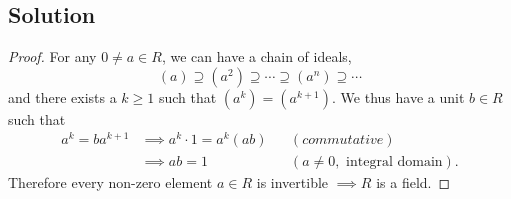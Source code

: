 \documentclass{article}
\theoremstyle{plain}
\begin{document}
\subsection*{Solution}
\begin{proof}
For any $0\ne a\in R$, we can have a chain of ideals,
\[(a)\supseteq(a^{2})\supseteq\cdots\supseteq(a^{n})\supseteq\cdots\] and there exists a $k\ge1$ such that
$(a^{k})=(a^{k+1})$. We thus have a unit $b\in R$ such that
\begin{align*}
  a^{k}=ba^{k+1}&\implies a^{k}\cdot1=a^{k}(ab)&& (commutative)\\
                  &\implies ab=1 && (a\ne0, \text{ integral domain}).
\end{align*}
Therefore every non-zero element $a\in R$ is invertible $\implies R$ is a field.
\end{proof}
\end{document}
